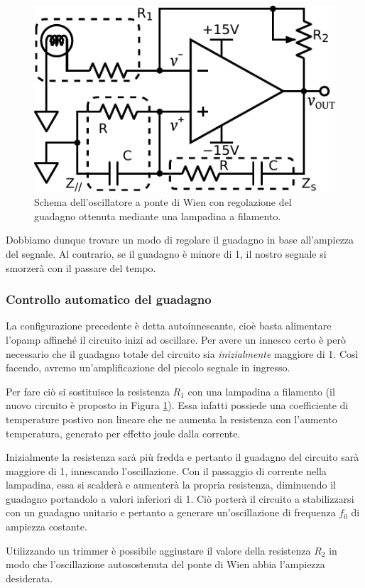 \begin{figure}
\centering
\includegraphics[width=.35\textwidth]{../E08/latex/osc_w_lamp.pdf}
\caption{Schema dell'oscillatore a ponte di Wien con regolazione del guadagno ottenuta mediante una lampadina a filamento.}
\label{cir8:with_lamp}
\end{figure}

Dobbiamo dunque trovare un modo di regolare il guadagno in base all'ampiezza del segnale.
Al contrario, se il guadagno è minore di 1, il nostro segnale si smorzerà con il passare del tempo.

\subsubsection*{Controllo automatico del guadagno}

La configurazione precedente è detta autoinnescante, cioè basta alimentare l'opamp affinché il circuito inizi ad oscillare.
Per avere un innesco certo è però necessario che il guadagno totale del circuito sia \textit{inizialmente} maggiore di \num{1}. Così facendo, avremo un'amplificazione del piccolo segnale in ingresso.

Per fare ciò si sostituisce la resistenza $R_1$ con una lampadina a filamento (il nuovo circuito è proposto in Figura \ref{cir8:with_lamp}).
Essa infatti possiede una coefficiente di temperature postivo non lineare che ne aumenta la resistenza con l'aumento temperatura, generato per effetto joule dalla corrente.

Inizialmente la resistenza sarà più fredda e pertanto il guadagno del circuito sarà maggiore di \num{1}, innescando l'oscillazione.
Con il passaggio di corrente nella lampadina, essa si scalderà e aumenterà la propria resistenza, diminuendo il guadagno portandolo a valori inferiori di \num{1}.
Ciò porterà il circuito a stabilizzarsi con un guadagno unitario e pertanto a generare un'oscillazione di frequenza $f_0$ di ampiezza costante.

Utilizzando un trimmer è possibile aggiustare il valore della resistenza $R_2$ in modo che l'oscillazione autosostenuta del ponte di Wien abbia l'ampiezza desiderata.

